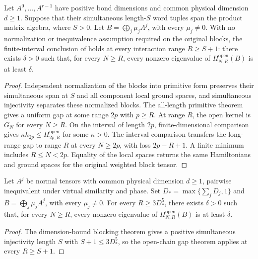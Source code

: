 \begin{lemma}
    \label{thm:block_open_gap_all_lengths_simultaneous_injectivity}
    \leanok
    Let $A^0,\ldots,A^{r-1}$ have positive bond dimensions and common
    physical dimension $d\geq1$. Suppose that their simultaneous
    length-$S$ word tuples span the product matrix algebra, where $S>0$.
    Let $B=\bigoplus_j\mu_jA^j$, with every $\mu_j\ne0$.
    With no normalization or inequivalence assumption required on the
    original blocks, the finite-interval conclusion of
    \cite[Theorem~1.2 and Section~6]{Nachtergaele1996Spectral} holds at
    every interaction range $R\geq S+1$: there exists $\delta>0$
    such that, for every $N\geq R$, every nonzero eigenvalue of
    $H^{\mathrm{open}}_{N,R}(B)$ is at least $\delta$.
\end{lemma}
\begin{proof}\leanok
    Independent normalization of the blocks into primitive form preserves
    their simultaneous span at $S$ and all component local ground spaces, and
    simultaneous injectivity separates these normalized blocks. The
    all-length primitive theorem gives a uniform gap at some range $2p$
    with $p\geq R$. At range $R$, the open kernel is $G_N$ for every
    $N\geq R$. On the interval of length $2p$, finite-dimensional
    comparison gives $\kappa h_{2p}\leq H^{\mathrm{open}}_{2p,R}$ for
    some $\kappa>0$. The interval comparison transfers the long-range
    gap to range $R$ at every $N\geq2p$, with loss $2p-R+1$.
    A finite minimum includes $R\leq N<2p$. Equality of the local spaces
    returns the same Hamiltonians and ground spaces for the original
    weighted block tensor.
\end{proof}

\begin{lemma}
    \label{thm:normal_block_open_gap_dimension_bound}
    \leanok
    Let $A^j$ be normal tensors with common physical dimension $d\geq1$,
    pairwise inequivalent under virtual similarity and phase. Set
    $D_* = \max\{\sum_j D_j,1\}$ and $B=\bigoplus_j\mu_jA^j$,
    with every $\mu_j\ne0$. For every $R\geq3D_*^5$, there exists
    $\delta>0$ such that, for every $N\geq R$, every nonzero eigenvalue of
    $H^{\mathrm{open}}_{N,R}(B)$ is at least $\delta$.
\end{lemma}
\begin{proof}\leanok
    The dimension-bound blocking theorem gives a positive simultaneous
    injectivity length $S$ with $S+1\leq3D_*^5$, so the open-chain gap
    theorem applies at every $R\geq S+1$.
\end{proof}

